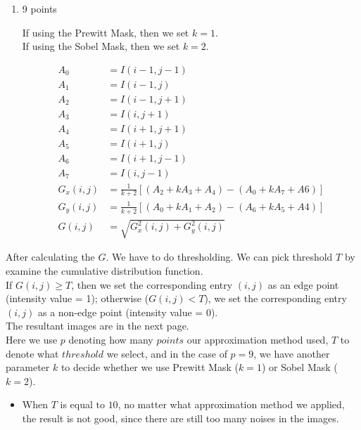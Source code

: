 \documentclass{article}
\begin{document}
\begin{enumerate}[label=(\alph*)]
\begin{enumerate}[label=(\roman*)]
        \item 9 points

        If using the Prewitt Mask, then we set $k = 1$. \\
        If using the Sobel Mask, then we set $k = 2$.

        \begin{align*}
            A_0 & = I(i - 1, j - 1) \\
            A_1 & = I(i - 1, j) \\
            A_2 & = I(i - 1, j + 1) \\
            A_3 & = I(i, j + 1) \\
            A_4 & = I(i + 1, j + 1) \\
            A_5 & = I(i + 1, j) \\
            A_6 & = I(i + 1, j - 1) \\
            A_7 & = I(i, j - 1) \\
            G_x(i, j) & = \frac{1}{k + 2}[(A_2 + kA_3 + A_4) - (A_0 + kA_7 + A6)] \\
            G_y(i, j) & = \frac{1}{k + 2}[(A_0 + kA_1 + A_2) - (A_6 + kA_5 + A4)] \\
            G(i, j) & = \sqrt{G_x^2(i, j) + G_y^2(i, j)}
        \end{align*}
    \end{enumerate}

    \newpage
    After calculating the $G$. We have to do thresholding. We can pick threshold $T$ by examine the cumulative distribution function. \\

    If $G(i, j) \ge T$, then we set the corresponding entry $(i, j)$ as an edge point (intensity value = 1); otherwise ($G(i, j) < T$), we set the corresponding entry $(i, j)$ as a non-edge point (intensity value = 0). \\

    The resultant images are in the next page. \\

    Here we use $p$ denoting how many $points$ our approximation method used, $T$ to denote what $threshold$ we select, and in the case of $p = 9$, we have another parameter $k$ to decide whether we use Prewitt Mask ($k = 1$) or Sobel Mask ($k = 2$). \\

    \begin{itemize}
        \item When $T$ is equal to $10$, no matter what approximation method we applied, the result is not good, since there are still too many noises in the images. 


\end{itemize}
\end{enumerate}
\end{document}
